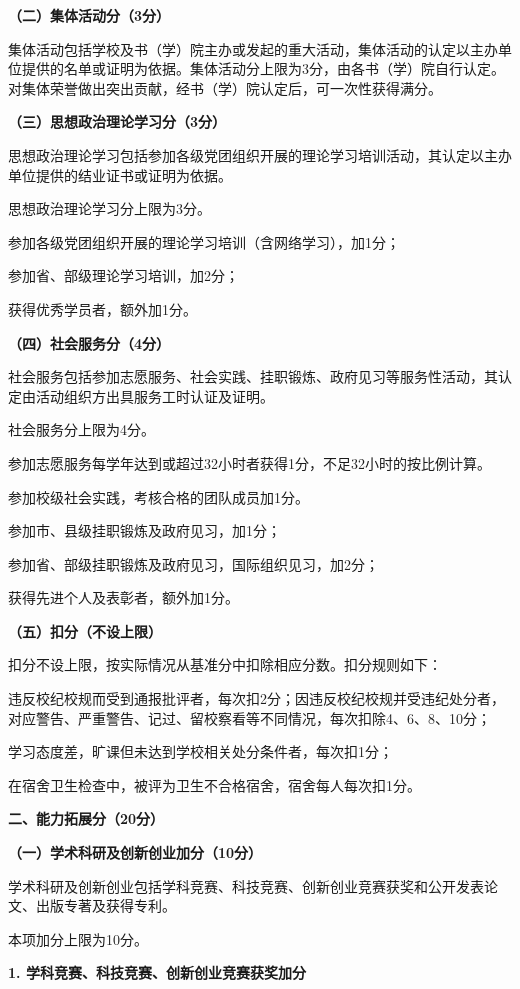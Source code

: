 \documentclass[
decoration,  %
]{qyxf-book}
\begin{document}
\textbf{（二）集体活动分（3分）}

集体活动包括学校及书（学）院主办或发起的重大活动，集体活动的认定以主办单位提供的名单或证明为依据。集体活动分上限为3分，由各书（学）院自行认定。对集体荣誉做出突出贡献，经书（学）院认定后，可一次性获得满分。

\textbf{（三）思想政治理论学习分（3分）}

思想政治理论学习包括参加各级党团组织开展的理论学习培训活动，其认定以主办单位提供的结业证书或证明为依据。

思想政治理论学习分上限为3分。

参加各级党团组织开展的理论学习培训（含网络学习），加1分；

参加省、部级理论学习培训，加2分；

获得优秀学员者，额外加1分。

\textbf{（四）社会服务分（4分）}

社会服务包括参加志愿服务、社会实践、挂职锻炼、政府见习等服务性活动，其认定由活动组织方出具服务工时认证及证明。

社会服务分上限为4分。

参加志愿服务每学年达到或超过32小时者获得1分，不足32小时的按比例计算。

参加校级社会实践，考核合格的团队成员加1分。

参加市、县级挂职锻炼及政府见习，加1分；

参加省、部级挂职锻炼及政府见习，国际组织见习，加2分；

获得先进个人及表彰者，额外加1分。

\textbf{（五）扣分（不设上限）}


扣分不设上限，按实际情况从基准分中扣除相应分数。扣分规则如下：

违反校纪校规而受到通报批评者，每次扣2分；因违反校纪校规并受违纪处分者，对应警告、严重警告、记过、留校察看等不同情况，每次扣除4、6、8、10分；

学习态度差，旷课但未达到学校相关处分条件者，每次扣1分；

在宿舍卫生检查中，被评为卫生不合格宿舍，宿舍每人每次扣1分。

\textbf{二、能力拓展分（20分）}

\textbf{（一）学术科研及创新创业加分（10分）}

学术科研及创新创业包括学科竞赛、科技竞赛、创新创业竞赛获奖和公开发表论文、出版专著及获得专利。

本项加分上限为10分。 

\textbf{1. 学科竞赛、科技竞赛、创新创业竞赛获奖加分}
\end{document}

